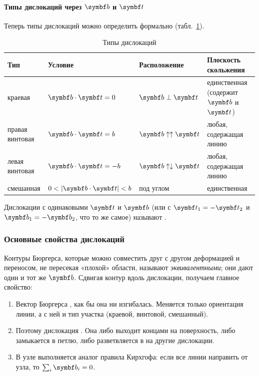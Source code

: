 \paragraph{Типы дислокаций через $\vb b$ и $\vb t$}
Теперь типы дислокаций можно определить формально
(табл.~\ref{tab:disl-types}).

\begin{table}[ht]
\centering
\caption{Типы дислокаций}
\label{tab:disl-types}
\small
\begin{tabularx}{\textwidth}{@{}lll>{\raggedright\arraybackslash}X@{}}
\toprule
Тип & Условие & Расположение & Плоскость скольжения \\
\midrule
краевая & $\vb b\cdot\vb t=0$ & $\vb b\perp\vb t$ & единственная (содержит $\vb b$ и $\vb t$) \\
правая винтовая & $\vb b\cdot\vb t=b$ & $\vb b\uparrow\uparrow\vb t$ & любая, содержащая линию \\
левая винтовая & $\vb b\cdot\vb t=-b$ & $\vb b\uparrow\downarrow\vb t$ & любая, содержащая линию \\
смешанная & $0<|\vb b\cdot\vb t|<b$ & под углом & единственная \\
\bottomrule
\end{tabularx}
\end{table}

Дислокации с одинаковыми $\vb t$ и $\vb b$ (или с $\vb t_1=-\vb t_2$ и
$\vb b_1=-\vb b_2$, что то же самое) называют .

\subsubsection{Основные свойства дислокаций}

Контуры Бюргерса, которые можно совместить друг с другом деформацией и
переносом, не пересекая «плохой» области, называют
\emph{эквивалентными}; они дают один и тот же $\vb b$. Сдвигая контур
вдоль дислокации, получаем главное свойство:

\begin{glavnoe}
\begin{enumerate}[label=\arabic*)]
\item Вектор Бюргерса ,
как бы она ни изгибалась. Меняется только ориентация линии, а с ней и
тип участка (краевой, винтовой, смешанный).
\item Поэтому дислокация .
Она либо выходит концами на поверхность, либо замыкается в петлю, либо
разветвляется в  на другие дислокации.
\item В узле выполняется аналог правила Кирхгофа: если все линии
направить от узла, то $\sum_i\vb b_i=0$.
\end{enumerate}
\end{glavnoe}

